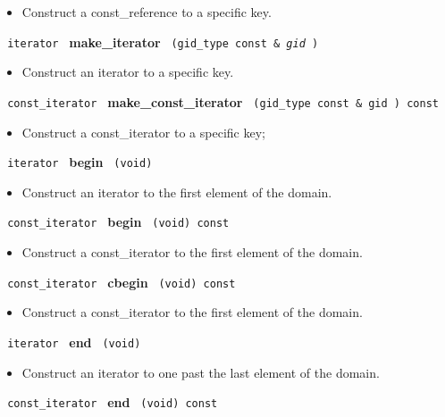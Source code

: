 \begin{itemize}
\item
Construct a const\_reference to a specific key.
\end{itemize}
 
\noindent
\texttt{%
iterator
}
\textbf{make\_iterator}%
\texttt{%
(gid\_type const \&
\textit{gid}%
)
}

\begin{itemize}
\item
Construct an iterator to a specific key.
\end{itemize}
 
\noindent
\texttt{%
const\_iterator 
}
\textbf{make\_const\_iterator}%
\texttt{%
(gid\_type const \&
gid
) const
}

\begin{itemize}
\item
Construct a const\_iterator to a specific key;
\end{itemize}
 
\texttt{%
iterator
}
\textbf{begin}%
\texttt{%
(void)
}

\begin{itemize}
\item
Construct an iterator to the first element of the domain.
\end{itemize}
 
\noindent
\texttt{%
const\_iterator
}
\textbf{begin}%
\texttt{%
(void) const
}

\begin{itemize}
\item
Construct a const\_iterator to the first element of the domain.
\end{itemize}
 
\noindent
\texttt{%
const\_iterator
}
\textbf{cbegin}%
\texttt{%
(void) const
}

\begin{itemize}
\item
Construct a const\_iterator to the first element of the domain.
\end{itemize}
 
\noindent
\texttt{%
iterator
}
\textbf{end}%
\texttt{%
(void)
}

\begin{itemize}
\item
Construct an iterator to one past the last element of the domain.
\end{itemize}
 
\noindent
\texttt{%
const\_iterator
}
\textbf{end}%
\texttt{%
(void) const
}

